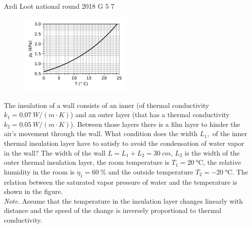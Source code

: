 \documentclass[11pt]{article}
\begin{document}
{Ardi Loot} %
{national round} %
{2018} %
{G 5} %
{7} %
{

\ifEngStatement
\begin{figure}
\vspace{-30pt}
\begin{center}
\includegraphics[width=0.5\textwidth]{2018-v3g-05-kullastunud-aur}
\par\end{center} 
\end{figure}
The insulation of a wall consists of an inner (of thermal conductivity $k_{1}=\SI{0.07}{W/\left(m\cdot K\right)}$) and an outer layer (that has a thermal conductivity $k_{2}=\SI{0.05}{W/\left(m\cdot K\right)}$). Between those layers there is a film layer to hinder the air’s movement through the wall. What condition does the width $L_{1},$ of the inner thermal insulation layer have to satisfy to avoid the condensation of water vapor in the wall? The width of the wall $L=L_{1}+L_{2}=\SI{30}{cm}$, $L_{2}$ is the width of the outer thermal insulation layer, the room temperature is $T_{1}=\SI{20}{\celsius}$, the relative humidity in the room is $\eta_{1}=\SI{60}{\percent}$ and the outside temperature $T_{2}=\SI{-20}{\celsius}$. The relation between the saturated vapor pressure of water and the temperature is shown in the figure.\\
\emph{Note.} Assume that the temperature in the insulation layer changes linearly with distance and the speed of the change is inversely proportional to thermal conductivity.
\fi
}
\end{document}

